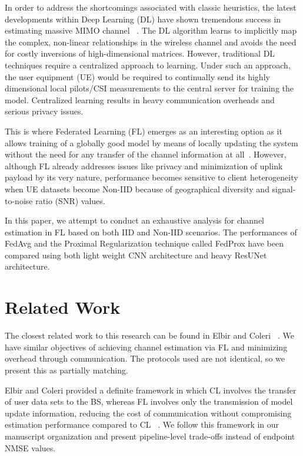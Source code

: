 \documentclass{llncs}
\begin{document}
In order to address the shortcomings associated with classic heuristics, the latest developments within Deep Learning (DL) have shown tremendous success in estimating massive MIMO channel ~\cite{wen2018deep, he2018deep, ye2018power, soltani2019deep}. The DL algorithm learns to implicitly
map the complex, non-linear relationships in the wireless channel and avoids the need for costly inversions of high-dimensional matrices. However, traditional DL techniques require a centralized approach to learning. Under such an approach, the user equipment (UE) would be required to continually send its highly dimensional local pilots/CSI measurements to the central server for training the model. Centralized learning results in heavy communication overheads and serious privacy issues.

This is where Federated Learning (FL) emerges as an interesting option as it allows training of a globally good model by means of locally updating the system without the need for any transfer of the channel information at all~\cite{kairouz2021survey, ghosh2019robust}. However, although FL already addresses issues like privacy and minimization of uplink payload by its very nature, performance becomes sensitive to client heterogeneity when UE datasets become Non-IID because of geographical diversity and signal-to-noise ratio (SNR)  values.

In this paper, we attempt to conduct an exhaustive analysis for channel estimation in FL based on both IID and Non-IID scenarios. The performances of FedAvg and the Proximal Regularization technique called FedProx have been compared using both light weight CNN architecture and heavy ResUNet architecture.

\section{Related Work}
The closest related work to this research can be found in Elbir and Coleri ~\cite{elbir2021flchannel}. We have similar objectives of achieving channel estimation via FL and minimizing overhead through communication. The protocols used are not identical, so we present this as partially matching.


Elbir and Coleri provided a definite framework in which CL involves the transfer of user data sets to the BS, whereas FL involves only the transmission of model update information, reducing the cost of communication without compromising estimation performance compared to CL ~\cite{elbir2021flchannel}. We follow this framework in our manuscript organization and present pipeline-level trade-offs instead of endpoint NMSE values.
\end{document}
